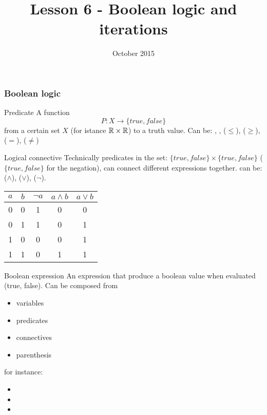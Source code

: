 


\title[Lesson 6]{\textbf{Lesson 6 - Boolean logic and iterations}}
\date[15/10/15]{ October 2015}



\begin{frame}[plain]
  \titlepage
\end{frame}

\begin{frame}
  \frametitle{Boolean logic}
  \begin{block}{Predicate}
    A function
    $$
    P:X\rightarrow \{true,false\}
    $$
    from a certain set $X$ (for istance $\mathbb{R}\times\mathbb{R}$) to a truth value. Can be: \cc{<}, \cc{>},
    \cc{<=} ($\leq$), \cc{>=} ($\geq$), \cc{==} ($=$), \cc{!=} ($\neq$)
    
  \end{block}
  \begin{block}{Logical connective}
    Technically predicates in the set:
    $\{true,false\}\times\{true,false\}$ ($\{true,false\}$ for the
    negation), can connect different expressions together. can be:
    \cc{\&\&} ($\wedge$), \cc{||} ($\vee$), \cc{!} ($\neg$).
    \begin{center}
      \begin{tabular}{|c|c||c|c|c|}
        \hline
        $a$ & $b$ & $\neg a$ & $a\wedge b$ & $a\vee b$ \\
        \hline
        0 & 0 & 1 & 0 & 0 \\
        0 & 1 & 1 & 0 & 1 \\
        1 & 0 & 0 & 0 & 1 \\
        1 & 1 & 0 & 1 & 1 \\
        \hline
      \end{tabular}
    \end{center}
  \end{block}
\end{frame}
\begin{frame}
  \begin{block}{Boolean expression}
    An expression that produce a boolean value when evaluated (true,
    false). Can be composed from
    \begin{itemize}
    \item variables
    \item predicates
    \item connectives
    \item parenthesis
    \end{itemize}
  \end{block}
  for instance:
  \begin{itemize}
  \item {}
  \item {}
  \item {}
  \end{itemize}
\end{frame}

